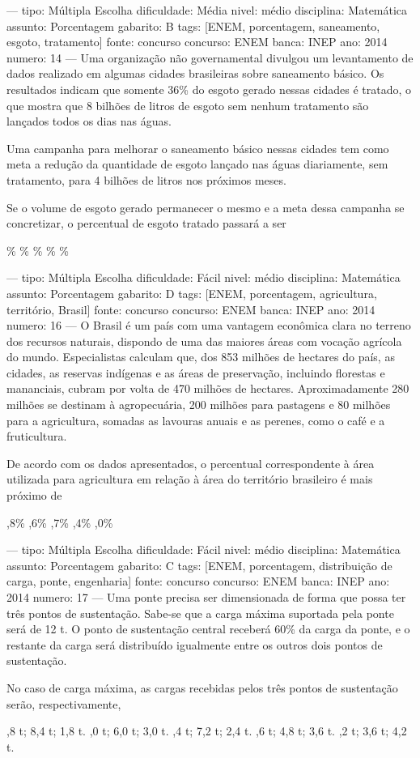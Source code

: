 ---
tipo: Múltipla Escolha
dificuldade: Média
nivel: médio
disciplina: Matemática
assunto: Porcentagem
gabarito: B
tags: [ENEM, porcentagem, saneamento, esgoto, tratamento]
fonte: concurso
concurso: ENEM
banca: INEP
ano: 2014
numero: 14
---
\question
Uma organização não governamental divulgou um levantamento de dados realizado em algumas cidades brasileiras sobre saneamento básico. Os resultados indicam que somente 36\% do esgoto gerado nessas cidades é tratado, o que mostra que 8 bilhões de litros de esgoto sem nenhum tratamento são lançados todos os dias nas águas.

Uma campanha para melhorar o saneamento básico nessas cidades tem como meta a redução da quantidade de esgoto lançado nas águas diariamente, sem tratamento, para 4 bilhões de litros nos próximos meses.

Se o volume de esgoto gerado permanecer o mesmo e a meta dessa campanha se concretizar, o percentual de esgoto tratado passará a ser
\begin{choices}
\%
\%
\%
\%
\%
\end{choices}

---
tipo: Múltipla Escolha
dificuldade: Fácil
nivel: médio
disciplina: Matemática
assunto: Porcentagem
gabarito: D
tags: [ENEM, porcentagem, agricultura, território, Brasil]
fonte: concurso
concurso: ENEM
banca: INEP
ano: 2014
numero: 16
---
\question
O Brasil é um país com uma vantagem econômica clara no terreno dos recursos naturais, dispondo de uma das maiores áreas com vocação agrícola do mundo. Especialistas calculam que, dos 853 milhões de hectares do país, as cidades, as reservas indígenas e as áreas de preservação, incluindo florestas e mananciais, cubram por volta de 470 milhões de hectares. Aproximadamente 280 milhões se destinam à agropecuária, 200 milhões para pastagens e 80 milhões para a agricultura, somadas as lavouras anuais e as perenes, como o café e a fruticultura.

De acordo com os dados apresentados, o percentual correspondente à área utilizada para agricultura em relação à área do território brasileiro é mais próximo de
\begin{choices}
,8\%
,6\%
,7\%
,4\%
,0\%
\end{choices}

---
tipo: Múltipla Escolha
dificuldade: Fácil
nivel: médio
disciplina: Matemática
assunto: Porcentagem
gabarito: C
tags: [ENEM, porcentagem, distribuição de carga, ponte, engenharia]
fonte: concurso
concurso: ENEM
banca: INEP
ano: 2014
numero: 17
---
\question
Uma ponte precisa ser dimensionada de forma que possa ter três pontos de sustentação. Sabe-se que a carga máxima suportada pela ponte será de 12 t. O ponto de sustentação central receberá 60\% da carga da ponte, e o restante da carga será distribuído igualmente entre os outros dois pontos de sustentação.

No caso de carga máxima, as cargas recebidas pelos três pontos de sustentação serão, respectivamente,
\begin{choices}
,8 t; 8,4 t; 1,8 t.
,0 t; 6,0 t; 3,0 t.
,4 t; 7,2 t; 2,4 t.
,6 t; 4,8 t; 3,6 t.
,2 t; 3,6 t; 4,2 t.
\end{choices}
